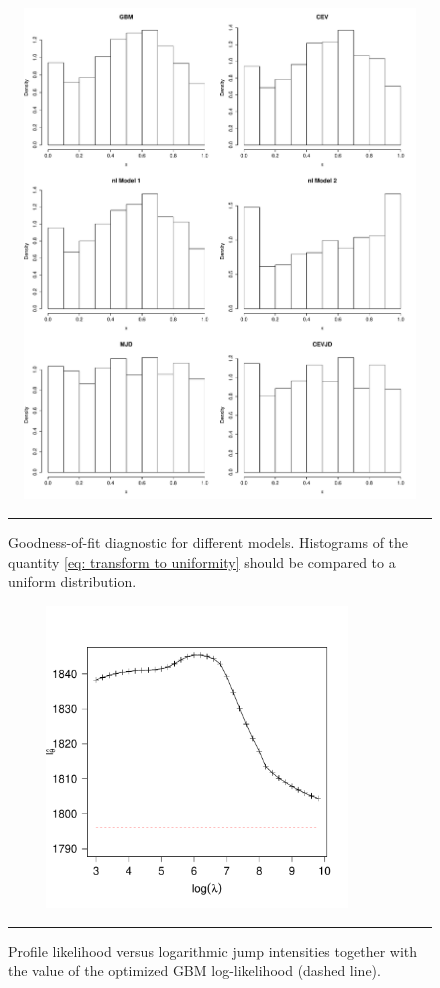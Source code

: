 	\begin{figure}[htbp]
		\centering
		\includegraphics[width=12cm,height=13cm]{./Figures/unidiagnostic2.pdf}
		\rule{35em}{0.5pt}
		\caption[Histograms of transformed empirical data]{Goodness-of-fit diagnostic for different models. 
			Histograms of the quantity \eqref{eq: transform to uniformity} should be compared to a uniform distribution.}
		\label{fig: uniform diagnostic}
	\end{figure}
	
	\begin{figure}[htbp]
		\centering
		\includegraphics[width=10cm,height=8cm]{./Figures/jllvslambda.pdf}
		\rule{35em}{0.5pt}
		\caption[Profile likelihood versus logarithmic jump intensities]{Profile likelihood versus logarithmic jump intensities together with the value of the optimized GBM log-likelihood (dashed line).}
		\label{fig: jll vs lambda}
	\end{figure}
	
